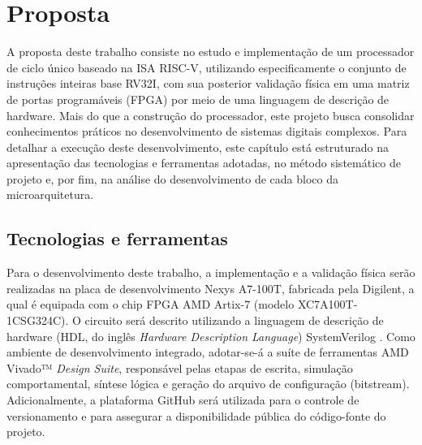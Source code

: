 \chapter{Proposta}\label{cap:proposta}

A proposta deste trabalho consiste no estudo e implementação de um processador de ciclo único baseado na ISA RISC-V, utilizando especificamente o conjunto de instruções inteiras base RV32I, com sua posterior validação física em uma matriz de portas programáveis (FPGA) por meio de uma linguagem de descrição de hardware. Mais do que a construção do processador, este projeto busca consolidar conhecimentos práticos no desenvolvimento de sistemas digitais complexos. Para detalhar a execução deste desenvolvimento, este capítulo está estruturado na apresentação das tecnologias e ferramentas adotadas, no método sistemático de projeto e, por fim, na análise do desenvolvimento de cada bloco da microarquitetura.

\section{Tecnologias e ferramentas}
\label{sec:materias}


Para o desenvolvimento deste trabalho, a implementação e a validação física serão realizadas na placa de desenvolvimento Nexys A7-100T, fabricada pela Digilent, a qual é equipada com o chip FPGA AMD Artix-7 (modelo XC7A100T-1CSG324C). O circuito será descrito utilizando a linguagem de descrição de hardware (HDL, do inglês \textit{Hardware Description Language}) SystemVerilog . Como ambiente de desenvolvimento integrado, adotar-se-á a suíte de ferramentas AMD Vivado™ \textit{Design Suite}, responsável pelas etapas de escrita, simulação comportamental, síntese lógica e geração do arquivo de configuração (bitstream). Adicionalmente, a plataforma GitHub será utilizada para o controle de versionamento e para assegurar a disponibilidade pública do código-fonte do projeto.

